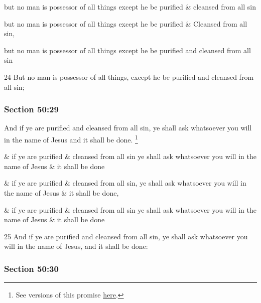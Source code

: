 		\begin{framed}
		\scriptsize
			\begin{compactdesc}
				\item[JSP] but no man is possessor of all things except he be purified \& cleansed from all sin
				\item[Gilbert] but no man is possessor of all things except he be purified \& Cleansed from all sin,
				\item[Hyde and Smith] but no man is possessor of all things except he be purified and cleansed from all sin
				\item[BC] 24 But no man is possessor of all things, except he be purified and cleansed from all sin;
			\end{compactdesc}
		\end{framed}

	\subsubsection{Section 50:29} %
		\label{DC50-29}

		And if ye are purified and cleansed from all sin, ye shall ask whatsoever you will in the name of Jesus and it shall be done.%
			\footnote{%
				See versions of this promise \hyperref[ASK-receive]{here}.
				}

		\begin{framed}
		\scriptsize
			\begin{compactdesc}
				\item[JSP] \& if ye are purified \& cleansed from all sin ye shall ask whatsoever you will in the name of Jesus \& it shall be done
				\item[Gilbert] \& if ye are purified \& cleansed from all sin, ye shall ask whatsoever you will in the name of Jesus \& it shall be done,
				\item[Hyde and Smith] \& if ye are purified \& cleansed from all sin ye shall ask whatsoever you will in the name of Jesus \& it shall be done
				\item[BC] 25 And if ye are purified and cleansed from all sin, ye shall ask whatsoever you will in the name of Jesus, and it shall be done:
			\end{compactdesc}
		\end{framed}

	\subsubsection{Section 50:30} %
		\label{DC50-30}

